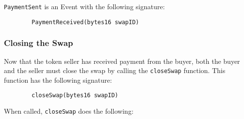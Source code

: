 \documentclass[11pt]{article}
\begin{document}
    \verb|PaymentSent| is an Event with the following signature:
    \begin{verbatim}
        PaymentReceived(bytes16 swapID)
    \end{verbatim}

    \subsubsection*{Closing the Swap}

    Now that the token seller has received payment from the buyer, both the buyer and the seller must close the swap by calling the \verb|closeSwap| function.
    This function has the following signature:
    \begin{verbatim}
        closeSwap(bytes16 swapID)
    \end{verbatim}

    When called, \verb|closeSwap| does the following:
\end{document}
